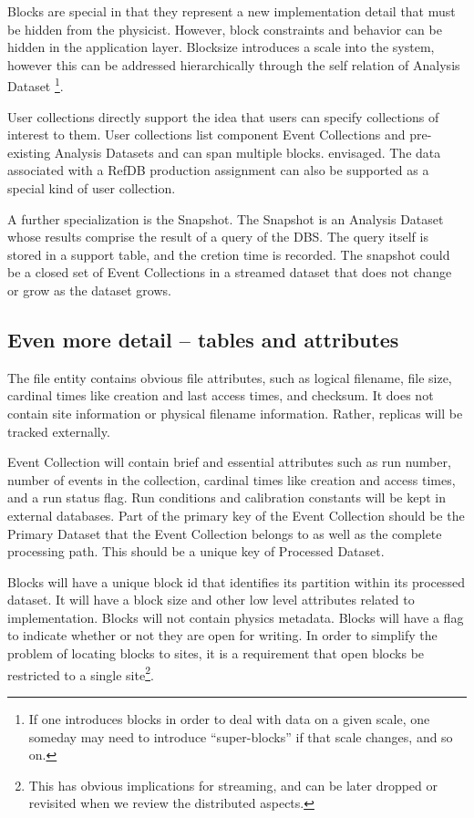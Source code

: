 \documentclass{cmspaper}
\begin{document}
Blocks are special in that they represent a new implementation detail 
that must be hidden from the physicist.  However, block constraints and 
behavior can be hidden in the application layer.  Blocksize 
introduces a scale into the system,  however this can be addressed hierarchically 
through the self relation of Analysis Dataset
\footnote{If one introduces blocks in order to deal with data on a given scale, one someday may need 
to introduce ``super-blocks'' if that scale changes, and so on.}. 

User collections directly support the idea that users can specify 
collections of interest to them.  User collections list component Event Collections
and pre-existing Analysis Datasets and can span multiple blocks.  
envisaged.  The data associated with a RefDB production assignment can also be supported 
as a special kind of user collection.

A further specialization is the Snapshot.  The Snapshot is an Analysis Dataset whose results 
comprise the result of a query of the DBS.  The query itself is stored in a support table, and 
the cretion time is recorded.
The snapshot could be a closed set of Event Collections in a streamed dataset that does 
not change or grow as the dataset grows.  

\subsection{Even more detail -- tables and attributes}

The file entity contains obvious 
file attributes, such as logical filename, file size, cardinal times like creation and 
last access times, and checksum.  It does not contain site information or physical filename 
information.  Rather, replicas will be tracked externally.  

Event Collection will contain brief and essential attributes such as run number, 
number of events in the collection, cardinal times like creation and access times, 
and a run status flag.  Run conditions and calibration constants will
be kept in external databases.  Part of the primary key of the Event Collection
should be the Primary Dataset that the Event Collection 
belongs to as well as the complete processing path.  This should be a unique key of 
Processed Dataset.  

Blocks will have a unique block id that identifies its partition within its processed dataset.
It will have a block size and other low level attributes related to implementation.  Blocks 
will not contain physics metadata.  
Blocks will have a flag to indicate whether or not they are open for writing. 
In order to simplify the problem of locating blocks to sites, it is a 
requirement that open blocks be restricted to a single site\footnote{This has obvious 
implications for streaming, and can be later dropped or revisited when we review the distributed 
aspects.}.
\end{document}
